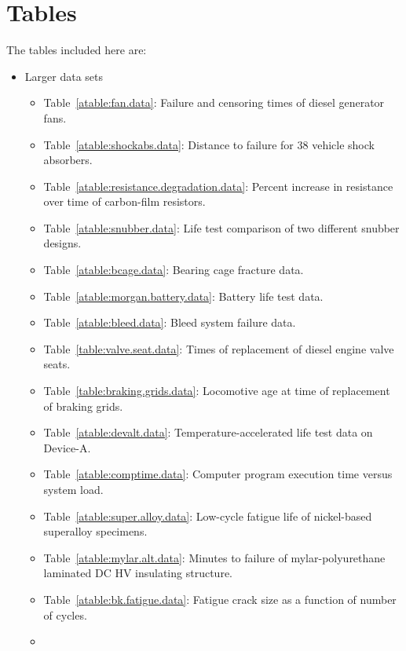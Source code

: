 
\chapter{Tables}
The tables included here are:
\begin{itemize}
\item
Larger data sets
\begin{itemize}
\item
Table~\ref{atable:fan.data}: Failure and censoring times of diesel
generator fans.
\item
Table~\ref{atable:shockabs.data}: Distance to failure for 38 vehicle
shock absorbers.
\item
Table~\ref{atable:resistance.degradation.data}: Percent increase in
resistance over time of carbon-film resistors.
\item
Table~\ref{atable:snubber.data}: Life test comparison of two
different snubber designs.
\item
Table~\ref{atable:bcage.data}: Bearing cage fracture data.
\item
Table~\ref{atable:morgan.battery.data}: Battery life test data.
\item
Table~\ref{atable:bleed.data}: Bleed system failure data.
\item
Table~\ref{table:valve.seat.data}: Times of replacement of diesel
engine valve seats.
\item
Table~\ref{table:braking.grids.data}: Locomotive age at time of
replacement of braking grids.
\item
Table~\ref{atable:devalt.data}: Temperature-accelerated life test data on Device-A.
\item
Table~\ref{atable:comptime.data}: Computer program execution time
versus system load.
\item
Table~\ref{atable:super.alloy.data}: Low-cycle fatigue life of
nickel-based superalloy specimens.
\item
Table~\ref{atable:mylar.alt.data}: Minutes to failure of
mylar-polyurethane laminated DC HV insulating structure.
\item
Table~\ref{atable:bk.fatigue.data}: Fatigue crack size as a function
of number of cycles.
\item

\end{itemize}
\end{itemize}
